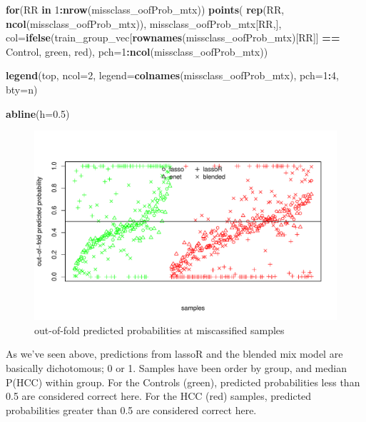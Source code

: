 \documentclass[
]{book}
\newenvironment{Shaded}{\begin{snugshade}}{\end{snugshade}}
\newcommand{\ControlFlowTok}[1]{\textcolor[rgb]{0.13,0.29,0.53}{\textbf{#1}}}
\newcommand{\DataTypeTok}[1]{\textcolor[rgb]{0.13,0.29,0.53}{#1}}
\newcommand{\DecValTok}[1]{\textcolor[rgb]{0.00,0.00,0.81}{#1}}
\newcommand{\FloatTok}[1]{\textcolor[rgb]{0.00,0.00,0.81}{#1}}
\newcommand{\KeywordTok}[1]{\textcolor[rgb]{0.13,0.29,0.53}{\textbf{#1}}}
\newcommand{\NormalTok}[1]{#1}
\newcommand{\OperatorTok}[1]{\textcolor[rgb]{0.81,0.36,0.00}{\textbf{#1}}}
\newcommand{\StringTok}[1]{\textcolor[rgb]{0.31,0.60,0.02}{#1}}
\begin{document}
\begin{Shaded}
\begin{Highlighting}[]
\ControlFlowTok{for}\NormalTok{(RR }\ControlFlowTok{in} \DecValTok{1}\OperatorTok{:}\KeywordTok{nrow}\NormalTok{(missclass\_oofProb\_mtx))}
\KeywordTok{points}\NormalTok{(}
 \KeywordTok{rep}\NormalTok{(RR, }\KeywordTok{ncol}\NormalTok{(missclass\_oofProb\_mtx)), }
\NormalTok{ missclass\_oofProb\_mtx[RR,],}
 \DataTypeTok{col=}\KeywordTok{ifelse}\NormalTok{(train\_group\_vec[}\KeywordTok{rownames}\NormalTok{(missclass\_oofProb\_mtx)[RR]] }\OperatorTok{==}\StringTok{ \textquotesingle{}Control\textquotesingle{}}\NormalTok{,}
  \StringTok{\textquotesingle{}green\textquotesingle{}}\NormalTok{, }\StringTok{\textquotesingle{}red\textquotesingle{}}\NormalTok{),}
 \DataTypeTok{pch=}\DecValTok{1}\OperatorTok{:}\KeywordTok{ncol}\NormalTok{(missclass\_oofProb\_mtx))}

\KeywordTok{legend}\NormalTok{(}\StringTok{\textquotesingle{}top\textquotesingle{}}\NormalTok{, }\DataTypeTok{ncol=}\DecValTok{2}\NormalTok{, }\DataTypeTok{legend=}\KeywordTok{colnames}\NormalTok{(missclass\_oofProb\_mtx), }
 \DataTypeTok{pch=}\DecValTok{1}\OperatorTok{:}\DecValTok{4}\NormalTok{, }\DataTypeTok{bty=}\StringTok{\textquotesingle{}n\textquotesingle{}}\NormalTok{)}

\KeywordTok{abline}\NormalTok{(}\DataTypeTok{h=}\FloatTok{0.5}\NormalTok{)}
\end{Highlighting}
\end{Shaded}

\begin{figure}
\centering
\includegraphics{Static/figures/misclassTrain-1.pdf}
\caption{\label{fig:misclassTrain}out-of-fold predicted probabilities at miscassified samples}
\end{figure}

As we've seen above, predictions from lassoR and the blended mix model
are basically dichotomous; 0 or 1. Samples have been order by group, and
median P(HCC) within group. For the Controls (green), predicted probabilities
less than 0.5 are considered correct here. For the HCC (red) samples,
predicted probabilities greater than 0.5 are considered correct here.
\end{document}
